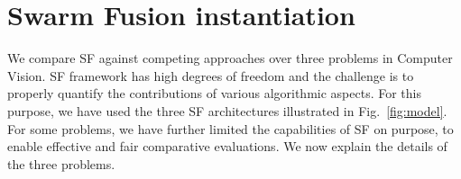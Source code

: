 \section{Swarm Fusion instantiation}
We compare SF against competing approaches over three problems in
Computer Vision. SF framework has high degrees of freedom and the
challenge is to properly quantify the contributions of various
algorithmic aspects. For this purpose, we have used the three SF
architectures illustrated in Fig.~\ref{fig:model}. For some problems,
we have further limited the capabilities of SF on purpose, to enable
effective and fair comparative evaluations. We now explain the details
of the three problems.





